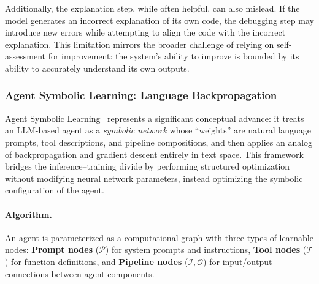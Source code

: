 Additionally, the explanation step, while often helpful, can also mislead. If the model generates an incorrect explanation of its own code, the debugging step may introduce new errors while attempting to align the code with the incorrect explanation. This limitation mirrors the broader challenge of relying on self-assessment for improvement: the system's ability to improve is bounded by its ability to accurately understand its own outputs.


\subsubsection{Agent Symbolic Learning: Language Backpropagation}
\label{sec:symbolic-learning}

Agent Symbolic Learning~\citep{zhou2024symbolic} represents a significant conceptual advance: it treats an LLM-based agent as a \emph{symbolic network} whose ``weights'' are natural language prompts, tool descriptions, and pipeline compositions, and then applies an analog of backpropagation and gradient descent entirely in text space. This framework bridges the inference--training divide by performing structured optimization without modifying neural network parameters, instead optimizing the symbolic configuration of the agent.

\paragraph{Algorithm.}
An agent is parameterized as a computational graph with three types of learnable nodes: \textbf{Prompt nodes} ($\mathcal{P}$) for system prompts and instructions, \textbf{Tool nodes} ($\mathcal{T}$) for function definitions, and \textbf{Pipeline nodes} ($\mathcal{I}, \mathcal{O}$) for input/output connections between agent components.

